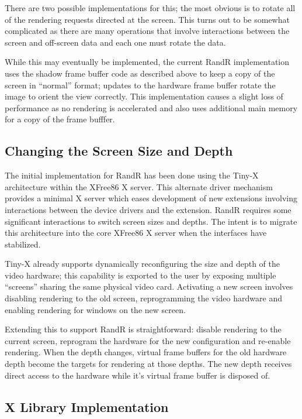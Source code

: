 \documentclass[twocolumn]{article}
\begin{document}
There are two possible implementations for this; the most obvious is to
rotate all of the rendering requests directed at the screen.  This turns out
to be somewhat complicated as there are many operations that involve
interactions between the screen and off-screen data and each one must rotate
the data.

While this may eventually be implemented, the current RandR implementation
uses the shadow frame buffer code as described above to keep a copy of the
screen in ``normal'' format; updates to the hardware frame buffer rotate the
image to orient the view correctly.  This implementation causes a slight
loss of performance as no rendering is accelerated and also uses
additional main memory for a copy of the frame bufffer.

\subsection{Changing the Screen Size and Depth}

The initial implementation for RandR has been done using the Tiny-X
architecture within the XFree86 X server.  This alternate driver mechanism
provides a minimal X server which eases development of new extensions
involving interactions between the device drivers and the extension.  RandR
requires some significant interactions to switch screen sizes and depths.
The intent is to migrate this architecture into the core XFree86 X server
when the interfaces have stabilized.

Tiny-X already supports dynamically reconfiguring the size and depth of the
video hardware; this capability is exported to the user by exposing multiple
``screens'' sharing the same physical video card.  Activating a new screen
involves disabling rendering to the old screen, reprogramming the video
hardware and enabling rendering for windows on the new screen.

Extending this to support RandR is straightforward: disable rendering to
the current screen, reprogram the hardware for the new configuration and
re-enable rendering.  When the depth changes, virtual frame buffers for the
old hardware depth become the targets for rendering at those depths. 
The new depth receives direct access to the hardware while it's virtual
frame buffer is disposed of.

\subsection{X Library Implementation}
\end{document}
